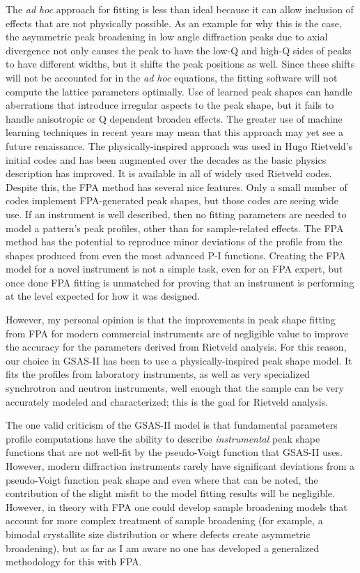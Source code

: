  The \textit{ad hoc} approach for fitting is less than ideal because it can allow inclusion of effects that are not physically possible. As an example for why this is the case, the asymmetric peak broadening in low angle diffraction peaks due to axial divergence not only causes the peak to have the low-Q and high-Q sides of peaks to have different widths, but it shifts the peak positions as well. Since these shifts will not be accounted for in the \textit{ad hoc} equations, the fitting software will not compute the lattice parameters optimally. Use of learned peak shapes can handle aberrations that introduce irregular aspects to the peak shape, but it fails to handle anisotropic or Q dependent broaden effects. The greater use of machine learning techniques in recent years may mean that this approach may yet see a future renaissance. The physically-inspired approach was used in Hugo Rietveld’s initial codes and has been augmented over the decades as the basic physics description has improved. It is available in all of widely used Rietveld codes. Despite this, the FPA method has several nice features. Only a small number of codes implement FPA-generated peak shapes, but those codes are seeing wide use. If an instrument is well described, then no fitting parameters are needed to model a pattern’s peak profiles, other than for sample-related effects. The FPA method has the potential to reproduce minor deviations of the profile from the shapes produced from even the most advanced P-I functions. Creating the FPA model for a novel instrument is not a simple task, even for an FPA expert, but once done FPA fitting is unmatched for proving that an instrument is performing at the level expected for how it was designed. 

 However, my personal opinion is that the improvements in peak shape fitting from FPA for modern commercial instruments are of negligible value to improve the accuracy for the parameters derived from Rietveld analysis. For this reason, our choice in GSAS-II has been to use a physically-inspired peak shape model. It fits the profiles from laboratory instruments, as well as very specialized synchrotron and neutron instruments, well enough that the sample can be very accurately modeled and characterized; this is the goal for Rietveld analysis.

 The one valid criticism of the GSAS-II model is that fundamental parameters profile computations have the ability to describe \textit{instrumental} peak shape functions that are not well-fit by the pseudo-Voigt function that GSAS-II uses. However, modern diffraction instruments rarely have significant deviations from a pseudo-Voigt function peak shape and even where that can be noted, the contribution of the slight misfit to the model fitting results will be negligible. However, in theory with FPA one could develop sample broadening models that account for more complex treatment of sample broadening (for example, a bimodal crystallite size distribution or where defects create asymmetric broadening), but as far as I am aware no one has developed a generalized methodology for this with FPA. 

